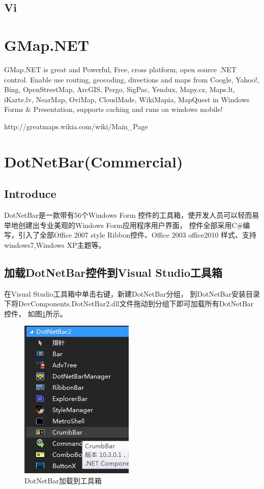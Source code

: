 \documentclass{book}
\begin{document}
\subsection{Vi}

\section{GMap.NET}

GMap.NET is great and Powerful, Free, cross platform, open source .NET control. 
Enable use routing, geocoding, directions and maps from Coogle, Yahoo!, 
Bing, OpenStreetMap, ArcGIS, Pergo, SigPac, Yendux, Mapy.cz, 
Maps.lt, iKarte.lv, NearMap, OviMap, CloudMade, WikiMapia, 
MapQuest in Windows Forms \& Presentation, supports caching and runs on windows mobile!

http://greatmaps.wikia.com/wiki/Main\_Page

\section{DotNetBar(Commercial)}

\subsection{Introduce}

DotNetBar是一款带有56个Windows Form 控件的工具箱，使开发人员可以轻而易举地创建出专业美观的Windows Form应用程序用户界面，
控件全部采用C\#编写，引入了全部Office 2007 style Ribbon控件、Office 2003 office2010 样式、支持windows7,Windows XP主题等。

\subsection{加载DotNetBar控件到Visual Studio工具箱}

在Visual Studio工具箱中单击右键，新建DotNetBar分组，
到DotNetBar安装目录下将DevComponents.DotNetBar2.dll文件拖动到分组下即可加载所有DotNetBar控件，
如图\ref{fig:DotNetBarControlLoadIntoToolBox}所示。

\begin{figure}[htbp]
	\centering
	\includegraphics[scale=0.8]{DotNetBarControlLoadIntoToolBox.jpg}
	\caption{DotNetBar加载到工具箱}
	\label{fig:DotNetBarControlLoadIntoToolBox}
\end{figure}
\end{document}
